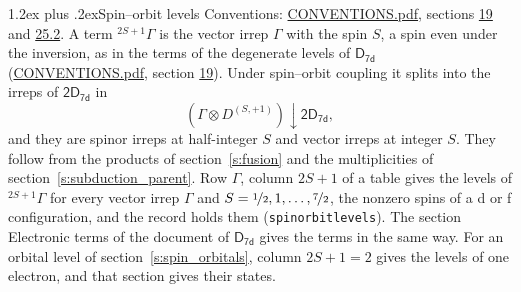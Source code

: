 \documentclass[10pt,a4paper]{article}
\makeatletter
\renewcommand\section{\@startsection{section}{1}{\z@}{-3ex plus -1ex minus -.2ex}%
  {1.2ex plus .2ex}{\normalfont\large\sffamily\bfseries\color{parttitle}}}
\numberwithin{equation}{section}
\newcommand{\grp}[1]{\mathsf{#1}}
\newcommand{\restr}[2]{#1\!\downarrow#2}
\newcommand{\irrJp}[2]{D^{(#1,#2)}}
\newcommand{\irrprod}{\otimes}
\newcommand{\term}[2]{{}^{#1}#2}
\makeatother
\begin{document}
\section{Spin--orbit levels}\label{s:spin_orbit}
Conventions: \href{../../CONVENTIONS.pdf}{CONVENTIONS.pdf}, sections \href{../../../rotation/CONVENTIONS.pdf\#conv.19}{19} and \href{../../CONVENTIONS.pdf\#conv.25.2}{25.2}.
\leavevmode\label{n:local.spin}\label{n:symbol.term}A term $\term{2S+1}{\Gamma}$ is the vector irrep $\Gamma$ with the spin $S$, a spin even under the inversion, as in the terms of the degenerate levels of \href{../../../rotation/data/pdf/D7d.pdf}{$\grp{D_{7d}}$} (\href{../../CONVENTIONS.pdf}{CONVENTIONS.pdf}, section \href{../../../rotation/CONVENTIONS.pdf\#conv.19}{19}). Under spin--orbit coupling it splits into the irreps of $\grp{2D_{7d}}$ in
\begin{equation}\label{e:spinorbit}\restr{(\Gamma \irrprod \irrJp{S}{+1})}{\grp{2D_{7d}}},\end{equation}
and they are spinor irreps at half-integer $S$ and vector irreps at integer $S$. They follow from the products of section~\ref{s:fusion} and the multiplicities of section~\ref{s:subduction_parent}. Row $\Gamma$, column $2S + 1$ of a table gives the levels of $\term{2S+1}{\Gamma}$ for every vector irrep $\Gamma$ and $S = \nicefrac{1}{2}, 1, \dots, \nicefrac{7}{2}$, the nonzero spins of a d or f configuration, and the record holds them (\texttt{spinorbitlevels}). The section Electronic terms of the document of \href{../../../rotation/data/pdf/D7d.pdf}{$\grp{D_{7d}}$} gives the terms in the same way. For an orbital level of section~\ref{s:spin_orbitals}, column $2S + 1 = 2$ gives the levels of one electron, and that section gives their states.
\end{document}

